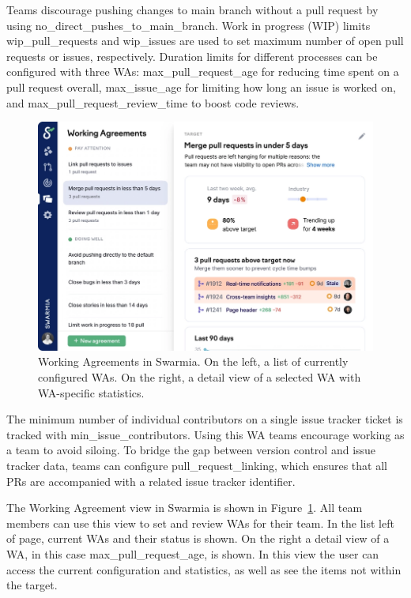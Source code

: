 Teams discourage pushing changes to main branch without a pull request by using no\_direct\_pushes\_to\_main\_branch. Work in progress (WIP) limits wip\_pull\_requests and wip\_issues are used to set maximum number of open pull requests or issues, respectively. Duration limits for different processes can be configured with three WAs: max\_pull\_request\_age for reducing time spent on a pull request overall, max\_issue\_age for limiting how long an issue is worked on, and max\_pull\_request\_review\_time to boost code reviews.

\begin{figure}[ht]
    \begin{center}
        \includegraphics[width=13.5cm]{LaTeX/images/improvement.png}
        \caption{Working Agreements in Swarmia. On the left, a list of currently configured WAs. On the right, a detail view of a selected WA with WA-specific statistics.}
        \label{fig:WorkingAgreementsView}
    \end{center}
\end{figure}

The minimum number of individual contributors on a single issue tracker ticket is tracked with min\_issue\_contributors. Using this WA teams encourage working as a team to avoid siloing. To bridge the gap between version control and issue tracker data, teams can configure pull\_request\_linking, which ensures that all PRs are accompanied with a related issue tracker identifier.

The Working Agreement view in Swarmia is shown in Figure~\ref{fig:WorkingAgreementsView}. All team members can use this view to set and review WAs for their team. In the list left of page, current WAs and their status is shown. On the right a detail view of a WA, in this case max\_pull\_request\_age, is shown. In this view the user can access the current configuration and statistics, as well as see the items not within the target. 

